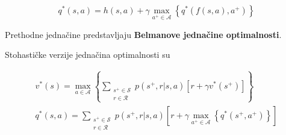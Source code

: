 \documentclass[12pt]{IEEEtran}
\numberwithin{equation}{subsection}
\numberwithin{figure}{subsection}
\theoremstyle{definition}
\numberwithin{example}{section}
\begin{document}
\begin{equation}
    q^{*}(s, a) = h(s, a) + \gamma\max_{a^{+} \in \mathcal{A}}\left\{q^{*}(f(s, a), a^{+})\right\}
\end{equation}

Prethodne jedna\v{c}ine predstavljaju \textbf{Belmanove jedna\v{c}ine optimalnosti}.

Stohasti\v{c}ke verzije jedna\v{c}ina optimalnosti su 

\begin{gather}
    v^{*}(s) = \max_{a \in \mathcal{A}}\left\{ \sum_{\substack{s^{+} \in \mathcal{S}\\r \in \mathcal{R}}}{p(s^{+}, r | s, a) \left[ r + \gamma v^{*}(s^{+}) \right]}\right\}\\
    q^{*}(s, a) = \sum_{\substack{s^{+} \in \mathcal{S}\\r \in \mathcal{R}}}{p(s^{+}, r | s, a)\left[ r + \gamma \max_{a^{+} \in \mathcal{A}} \left\{ q^{*}(s^{+}, a^{+}) \right\} \right]}
\end{gather}
\end{document}
